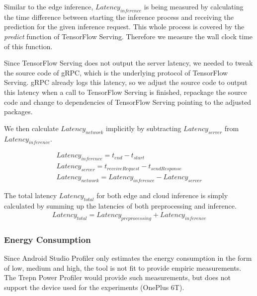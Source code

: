 Similar to the edge inference, $Latency_{inference}$ is being measured by calculating the time difference between starting the inference process and receiving the prediction for the given inference request. This whole process is covered by the \emph{predict} function of TensorFlow Serving. Therefore we measure the wall clock time of this function.

Since TensorFlow Serving does not output the server latency, we needed to tweak the source code of gRPC, which is the underlying protocol of TensorFlow Serving. gRPC already logs this latency, so we adjust the source code to output this latency when a call to TensorFlow Serving is finished, repackage the source code and change to dependencies of TensorFlow Serving pointing to the adjusted packages.

We then calculate $Latency_{network}$ implicitly by subtracting $Latency_{server}$ from $Latency_{inference}$.

\begin{equation*}
\begin{gathered}
Latency_{inference} = t_{end} - t_{start}\\
Latency_{server}= t_{receive Request} - t_{send Response}\\
Latency_{network} = Latency_{inference} - Latency_{server}
\end{gathered}
\end{equation*}


The total latency $Latency_{total}$ for both edge and cloud inference is simply calculated by summing up the latencies of both preprocessing and inference.
\begin{equation*}
\begin{gathered}
Latency_{total} = Latency_{preprocessing} + Latency_{inference}
\end{gathered}
\end{equation*}
\subsubsection{Energy Consumption}
Since Android Studio Profiler only estimates the energy consumption in the form of low, medium and high, the tool is not fit to provide empiric measurements. The Trepn Power Profiler would provide such measurements, but does not support the device used for the experiments (OnePlus 6T).
